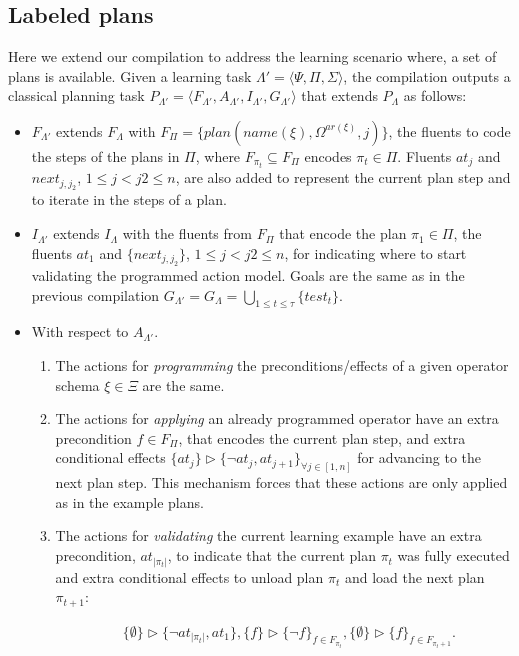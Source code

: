 \documentclass[letterpaper]{article} %
\newcommand{\tup}[1]{{\langle #1 \rangle}}
\begin{document}
\subsection{Labeled plans}
Here  we extend our compilation to address the learning scenario where, a set of plans is available. Given a learning task $\Lambda'=\tup{\Psi,\Pi,\Sigma}$, the compilation outputs a classical planning task $P_{\Lambda'}=\tup{F_{\Lambda'},A_{\Lambda'},I_{\Lambda'},G_{\Lambda'}}$ that extends $P_{\Lambda}$ as follows:
\begin{itemize}
\item $F_{\Lambda'}$ extends $F_{\Lambda}$ with $F_{\Pi}=\{plan(name(\xi),\Omega^{ar(\xi)},j)\}$, the fluents to code the steps of the plans in $\Pi$, where $F_{\pi_t}\subseteq F_{\Pi}$ encodes $\pi_t\in \Pi$. Fluents $at_j$ and $next_{j,j_2}$, {\small $1\leq j<j2\leq n$}, are also added to represent the current plan step and to iterate in the steps of a plan.
\item $I_{\Lambda'}$ extends $I_{\Lambda}$ with the fluents from $F_{\Pi}$ that encode the plan $\pi_1\in \Pi$, the fluents $at_1$ and $\{next_{j,j_2}\}$, {\small $1\leq j<j2\leq n$}, for indicating where to start validating the programmed action model. Goals are the same as in the previous compilation $G_{\Lambda'}=G_{\Lambda}=\bigcup_{1\leq t\leq \tau}\{test_t\}$.
\item With respect to $A_{\Lambda'}$.
\begin{enumerate}
\item The actions for {\em programming} the preconditions/effects of a given operator schema $\xi\in\Xi$ are the same.
\item The actions for {\em applying} an already programmed operator have an extra precondition $f\in F_{\Pi}$, that encodes the current plan step, and extra conditional effects $\{at_{j}\}\rhd\{\neg at_{j},at_{j+1}\}_{\forall j\in [1,n]}$ for advancing to the next plan step. This mechanism forces that these actions are only applied as in the example plans.
\item The actions for {\em validating} the current learning example have an extra precondition, $at_{|\pi_t|}$, to indicate that the current plan $\pi_t$ was fully executed and extra conditional effects to unload plan $\pi_{t}$ and load the next plan $\pi_{t+1}$:
\begin{small}
\begin{align*}
&\{\emptyset\}\rhd\{\neg at_{|\pi_t|},at_1\}, \{f\}\rhd\{\neg f\}_{f\in F_{\pi_t}}, \{\emptyset\}\rhd\{f\}_{f\in F_{\pi_t+1}}.
\end{align*}
\end{small}
\end{enumerate}
\end{itemize}
\end{document}
